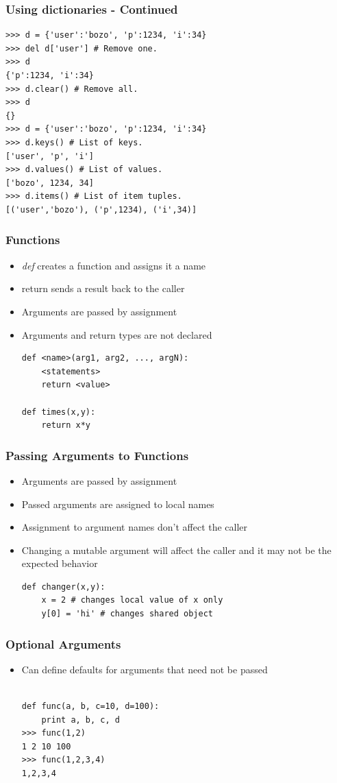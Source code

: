 \documentclass[12pt,handout]{beamer}
\begin{document}
\begin{frame}[fragile]
\frametitle{Using dictionaries - Continued}
\small{
\begin{verbatim}
>>> d = {'user':'bozo', 'p':1234, 'i':34}
>>> del d['user'] # Remove one.
>>> d
{'p':1234, 'i':34}
>>> d.clear() # Remove all.
>>> d
{}
>>> d = {'user':'bozo', 'p':1234, 'i':34}
>>> d.keys() # List of keys.
['user', 'p', 'i']
>>> d.values() # List of values.
['bozo', 1234, 34]
>>> d.items() # List of item tuples.
[('user','bozo'), ('p',1234), ('i',34)]
\end{verbatim}
}
\end{frame}
 
\begin{frame}[fragile]
\frametitle{Functions}
\begin{itemize}
\item {\it def} creates a function and assigns it a name
\item return sends a result back to the caller
\item Arguments are passed by assignment
\item Arguments and return types are not declared
\small{
\begin{verbatim}
def <name>(arg1, arg2, ..., argN):
    <statements>
    return <value>

def times(x,y):
    return x*y
\end{verbatim}
}
\end{itemize}
\end{frame}

\begin{frame}[fragile]
\frametitle{Passing Arguments to Functions}
\begin{itemize}
\item Arguments are passed by assignment
\item Passed arguments are assigned to local names
\item Assignment to argument names don't affect the 
caller
\item Changing a mutable argument will affect the caller
  and it may not be the expected behavior
\small{
\begin{verbatim}
def changer(x,y):
    x = 2 # changes local value of x only
    y[0] = 'hi' # changes shared object
\end{verbatim}
}

\end{itemize}
\end{frame}

\begin{frame}[fragile]
\frametitle{Optional Arguments}
\begin{itemize}

\item Can define defaults for arguments that need not be 
passed
\small{
\begin{verbatim}

def func(a, b, c=10, d=100):
    print a, b, c, d
>>> func(1,2)
1 2 10 100
>>> func(1,2,3,4)
1,2,3,4
\end{verbatim}
}
\end{itemize}
\end{frame}
\end{document}
